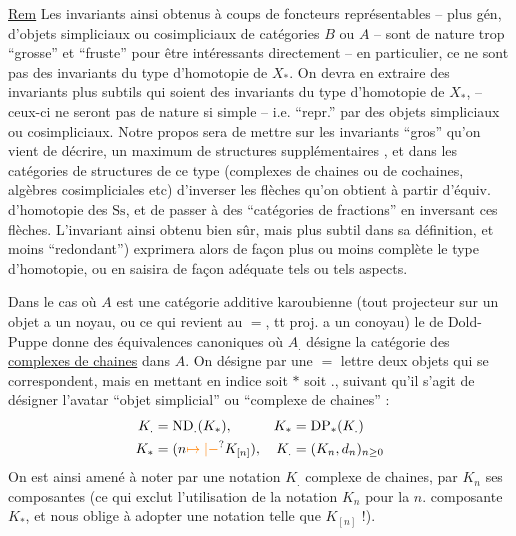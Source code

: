 \uline{Rem} Les  invariants ainsi obtenus à coups de foncteurs représentables -- plus gén, d'objets simpliciaux ou cosimpliciaux de catégories $B$ ou $A$ -- sont de nature trop ``grosse'' et ``fruste'' pour être intéressants directement --  en particulier, ce ne sont pas des invariants du type d'homotopie de $X_*$. On devra en extraire des invariants plus subtils qui soient des invariants du type d'homotopie de $X_*$, -- ceux-ci ne seront pas de nature si simple -- i.e. ``repr.'' par des objets simpliciaux ou cosimpliciaux. Notre propos sera de mettre sur les invariants ``gros'' qu'on vient de décrire, un maximum de structures supplémentaires , et dans les catégories de structures de ce type (complexes de chaines ou de cochaines, algèbres cosimpliciales etc) d'inverser les flèches qu'on obtient à partir d'équiv. d'homotopie des $\mathrm{Ss}$, et de passer à des ``catégories de fractions'' en inversant ces flèches. L'invariant ainsi obtenu   bien sûr, mais plus subtil dans sa définition, et moins ``redondant'') exprimera alors de façon plus ou moins complète le type d'homotopie, ou en saisira de façon adéquate tels ou tels aspects.

Dans le cas où $A$ est une catégorie additive karoubienne (tout projecteur sur un objet a un noyau, ou ce qui revient au $=$, tt proj. a un conoyau) le  de Dold-Puppe donne des équivalences canoniques
où $A_.$ désigne la catégorie des \uline{complexes de chaines} dans $A$. On désigne par une $=$ lettre  deux objets qui se correspondent, mais en mettant en indice soit $*$ soit $.$, suivant qu'il
s'agit de désigner l'avatar ``objet simplicial'' ou ``complexe de chaines'' :
\[
 \begin{aligned}
 K_.&=\mathrm{ND}_ .(K_*), &K_*&=\mathrm{DP}_*(K_.)\\
 K_*&=(n\unsure{\mapsto|-}K_{[n]}), &K_.&=(K_n,d_n)_{n\geq0}
 \end{aligned}
\]
On est ainsi amené à noter par une notation $K_.$  complexe de chaines, par $K_n$ ses composantes (ce qui exclut l'utilisation de la notation $K_n$ pour la $n$. composante  $K_*$, et nous oblige à adopter une notation telle que $K_{[n]}$ !).

